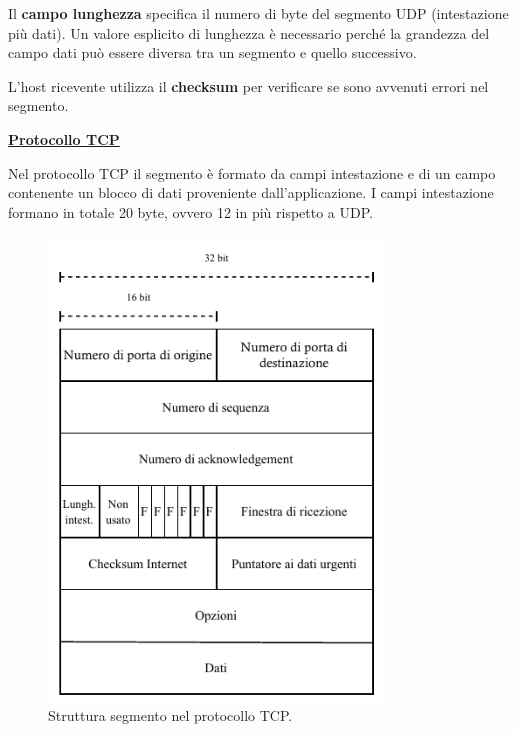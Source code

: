 \documentclass[a4paper]{article}
\begin{document}
	\noindent
	Il \textbf{campo lunghezza} specifica il numero di byte del segmento UDP (intestazione più dati). Un valore esplicito di lunghezza è necessario perché la grandezza del campo dati può essere diversa tra un segmento e quello successivo.\newline
	
	\noindent
	L'host ricevente utilizza il \textbf{checksum} per verificare se sono avvenuti errori nel segmento.
	
	\newpage
	
	\noindent
	\textcolor{Red3}{\textbf{\underline{Protocollo TCP}}}\newline
	
	\noindent
	Nel protocollo TCP il segmento è formato da campi intestazione e di un campo contenente un blocco di dati proveniente dall’applicazione. I campi intestazione formano in totale 20 byte, ovvero 12 in più rispetto a UDP.
	\begin{figure}[!htp]
		\centering
		\includegraphics[width=0.8\textwidth]{img/segmento_tcp.pdf}
		\caption{Struttura segmento nel protocollo TCP.}
	\end{figure}
\end{document}
